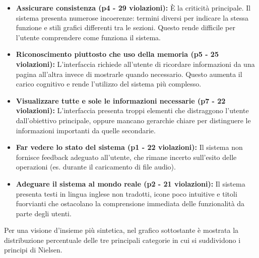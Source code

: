 \begin{itemize}
  \item \textbf{Assicurare consistenza (p4 - 29 violazioni):} È la criticità principale.
    Il sistema presenta numerose incoerenze: termini diversi per indicare la stessa funzione
    e stili grafici differenti tra le sezioni.
    Questo rende difficile per l'utente comprendere come funziona il sistema.

  \item \textbf{Riconoscimento piuttosto che uso della memoria (p5 - 25 violazioni):}
    L'interfaccia richiede all'utente di ricordare informazioni da una pagina all'altra
    invece di mostrarle quando necessario. Questo aumenta il carico cognitivo e rende
    l'utilizzo del sistema più complesso.

  \item \textbf{Visualizzare tutte e sole le informazioni necessarie (p7 - 22 violazioni):}
    L'interfaccia presenta troppi elementi che distraggono l'utente dall'obiettivo principale,
    oppure mancano gerarchie chiare per distinguere le informazioni importanti da quelle secondarie.

  \item \textbf{Far vedere lo stato del sistema (p1 - 22 violazioni):} Il sistema non fornisce feedback
    adeguato all'utente, che rimane incerto sull'esito delle operazioni (es. durante il caricamento di file audio).

  \item \textbf{Adeguare il sistema al mondo reale (p2 - 21 violazioni):} Il sistema presenta
    testi in lingua inglese non tradotti, icone poco intuitive e titoli fuorvianti che ostacolano la comprensione immediata delle funzionalità da parte degli utenti.
\end{itemize}

Per una visione d'insieme più sintetica, nel grafico sottostante è mostrata la distribuzione percentuale delle tre principali categorie in cui si suddividono i principi di Nielsen.

